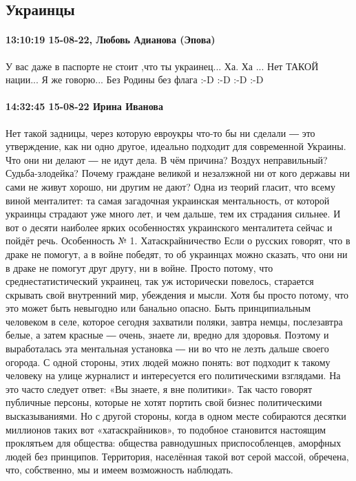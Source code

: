  
 
 
 
 

\subsection{Украинцы}


\paragraph{13:10:19 15-08-22, Любовь Адианова (Эпова)}

У вас даже в паспорте не стоит ,что ты украинец...
Ха. Ха ...
Нет ТАКОЙ нации...
Я же говорю...
Без Родины без флага
:-D :-D :-D :-D

\paragraph{14:32:45 15-08-22 Ирина Иванова}

Нет такой задницы, через которую евроукры что-то бы ни сделали ― это
утверждение, как ни одно другое, идеально подходит для современной Украины. Что
они ни делают ― не идут дела. В чём причина? Воздух неправильный?
Судьба-злодейка? Почему граждане великой и незалэжной ни от кого державы ни
сами не живут хорошо, ни другим не дают? Одна из теорий гласит, что всему виной
менталитет: та самая загадочная украинская ментальность, от которой украинцы
страдают уже много лет, и чем дальше, тем их страдания сильнее. И вот о десяти
наиболее ярких особенностях украинского менталитета сейчас и пойдёт
речь. Особенность № 1. Хатаскрайничество Если о русских говорят, что в драке
не помогут, а в войне победят, то об украинцах можно сказать, что они ни в
драке не помогут друг другу, ни в войне. Просто потому, что
среднестатистический украинец, так уж исторически повелось, старается скрывать
свой внутренний мир, убеждения и мысли. Хотя бы просто потому, что это может
быть невыгодно или банально опасно. Быть принципиальным человеком в селе,
которое сегодня захватили поляки, завтра немцы, послезавтра белые, а затем
красные ― очень, знаете ли, вредно для здоровья. Поэтому и выработалась эта
ментальная установка ― ни во что не лезть дальше своего огорода. С одной
стороны, этих людей можно понять: вот подходит к такому человеку на улице
журналист и интересуется его политическими взглядами. На это часто следует
ответ: «Вы знаете, я вне политики». Так часто говорят публичные персоны,
которые не хотят портить свой бизнес политическими высказываниями. Но с другой
стороны, когда в одном месте собираются десятки миллионов таких вот
«хатаскрайников», то подобное становится настоящим проклятьем для общества:
общества равнодушных приспособленцев, аморфных людей без принципов. Территория,
населённая такой вот серой массой, обречена, что, собственно, мы и имеем
возможность наблюдать.

